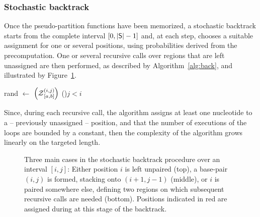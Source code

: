 \subsubsection{Stochastic backtrack}
Once the pseudo-partition functions have been memorized, a stochastic backtrack starts from the complete interval $[0,|\text{\sf S}|-1]$ and, at each step, chooses a suitable assignment for one or several positions, using probabilities derived from the precomputation. One or several recursive calls over regions that are left unassigned are then performed, as described by Algorithm~\ref{alg:back}, and illustrated by Figure~\ref{fig:stochastic}.
\begin{algorithm}[t]
\DontPrintSemicolon
	\SetAlgoLined
{}
	rand $\leftarrow$ \Random$\left(\Z{i,j}{a,b}\right)$\tcp*[r]{Draw random number in $[0,\Z{i,j}{a,b}[$}
 \lIf(){$j<i$}{\Return{$\varepsilon$}}
\caption{\protect\Backtrack$\left(i,j,a,b,\Target\right)$\label{alg:back}}
\end{algorithm}

Since, during each recursive call, the algorithm assigns at least one nucleotide to a -- previously unassigned -- position, and that the number of executions of the loops are bounded by a constant, then the complexity of the algorithm grows linearly on the targeted length. 

\begin{figure}
\resizebox{\textwidth}{!}{}
\caption{Three main cases in the stochastic backtrack procedure over an interval $[i,j]$: Either position $i$ is left unpaired (top), a base-pair $(i,j)$ is formed, stacking onto $(i+1,j-1)$ (middle), or $i$ is paired somewhere else, defining two regions on which subsequent recursive calls are needed (bottom). Positions indicated in red are assigned during at this stage of the backtrack.\label{fig:stochastic}}
\end{figure}



